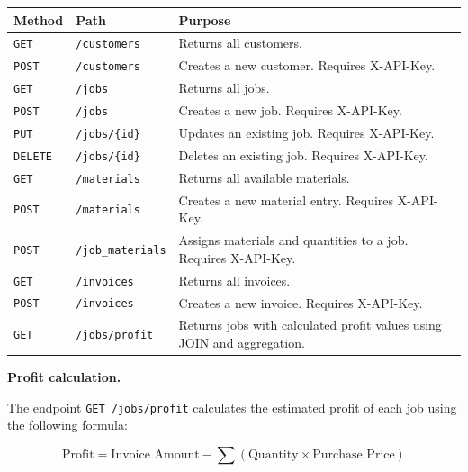 \documentclass[11pt,a4paper]{article}
\begin{document}
\renewcommand{\arraystretch}{1.2}
\begin{tabularx}{\linewidth}{@{}p{2cm}p{4cm}X@{}}
\toprule
\textbf{Method} & \textbf{Path} & \textbf{Purpose} \\
\midrule

\texttt{GET} &
\texttt{/customers} &
Returns all customers. \\

\texttt{POST} &
\texttt{/customers} &
Creates a new customer. Requires X-API-Key. \\

\texttt{GET} &
\texttt{/jobs} &
Returns all jobs. \\

\texttt{POST} &
\texttt{/jobs} &
Creates a new job. Requires X-API-Key. \\

\texttt{PUT} &
\texttt{/jobs/\{id\}} &
Updates an existing job. Requires X-API-Key. \\

\texttt{DELETE} &
\texttt{/jobs/\{id\}} &
Deletes an existing job. Requires X-API-Key. \\

\texttt{GET} &
\texttt{/materials} &
Returns all available materials. \\

\texttt{POST} &
\texttt{/materials} &
Creates a new material entry. Requires X-API-Key. \\

\texttt{POST} &
\texttt{/job\_materials} &
Assigns materials and quantities to a job.
Requires X-API-Key. \\

\texttt{GET} &
\texttt{/invoices} &
Returns all invoices. \\

\texttt{POST} &
\texttt{/invoices} &
Creates a new invoice. Requires X-API-Key. \\

\texttt{GET} &
\texttt{/jobs/profit} &
Returns jobs with calculated profit values using JOIN
and aggregation. \\

\bottomrule
\end{tabularx}

\textbf{Profit calculation.}

The endpoint \texttt{GET /jobs/profit} calculates the estimated profit of
each job using the following formula:

\[
\text{Profit} =
\text{Invoice Amount}
-
\sum(\text{Quantity} \times \text{Purchase Price})
\]
\end{document}
